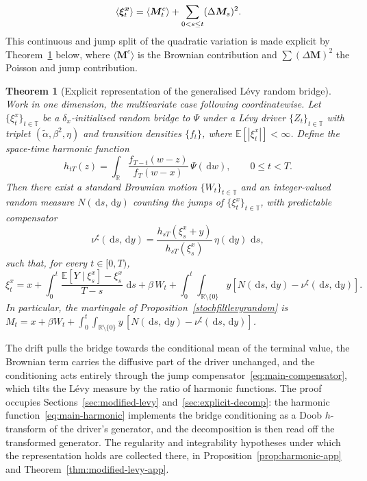 \documentclass{article}
\newtheorem{thm}{Theorem}[section]
\newcommand{\levy}{{L\'evy }}
\def\R{\mathbb{R}}
\def\E{\mathbb{E}}
\def\T{\mathbb{T}}
\def\d{\,\mathrm{d}}
\def\xib{\boldsymbol{\xi}}
\theoremstyle{definition}
\begin{document}
\begin{align}
\langle \xib^{\boldsymbol{x}}_t\rangle = \langle \boldsymbol{M}_t^c \rangle + \sum_{0 < s \leq t} (\Delta\boldsymbol{M}_s)^2. \notag
\end{align}
This continuous and jump split of the quadratic variation is made explicit by Theorem~\ref{thm:main-rep} below, where $\langle \boldsymbol{M}^c\rangle$ is the Brownian contribution and $\sum(\Delta\boldsymbol{M})^2$ the Poisson and jump contribution.

\begin{thm}[Explicit representation of the generalised \levy random bridge]
\label{thm:main-rep}
Work in one dimension, the multivariate case following coordinatewise. Let $\{\xi^{x}_t\}_{t \in \T}$ be a $\delta_x$-initialised random bridge to $\Psi$ under a \levy driver $\{Z_t\}_{t\in\T}$ with triplet $(\widetilde{\alpha}, \beta^2, \eta)$ and transition densities $\{f_t\}$, where $\E[|\xi^{x}_t|] < \infty$. Define the space-time harmonic function
\begin{equation}\label{eq:main-harmonic}
  h_{tT}(z) = \int_{\R} \frac{f_{T-t}(w - z)}{f_T(w - x)}\,\Psi(\d w), \qquad 0 \leq t < T.
\end{equation}
Then there exist a standard Brownian motion $\{W_t\}_{t\in\T}$ and an integer-valued random measure $N(\d s, \d y)$ counting the jumps of $\{\xi^{x}_t\}_{t\in\T}$, with predictable compensator
\begin{equation}\label{eq:main-compensator}
  \nu^{\xi}(\d s, \d y) = \frac{h_{sT}(\xi^{x}_s + y)}{h_{sT}(\xi^{x}_s)}\,\eta(\d y)\,\d s,
\end{equation}
such that, for every $t \in [0,T)$,
\begin{equation}\label{eq:main-rep}
  \xi^{x}_t = x + \int_0^t \frac{\E[Y \mid \xi^{x}_s] - \xi^{x}_s}{T-s}\,\d s
    + \beta\,W_t
    + \int_0^t\!\int_{\R \setminus \{0\}} y \left[N(\d s, \d y) - \nu^{\xi}(\d s, \d y)\right].
\end{equation}
In particular, the martingale of Proposition~\ref{stochfiltlevyrandom} is $M_t = x + \beta W_t + \int_0^t\!\int_{\R\setminus\{0\}} y\,[N(\d s,\d y) - \nu^{\xi}(\d s,\d y)]$.
\end{thm}
The drift pulls the bridge towards the conditional mean of the terminal value, the Brownian term carries the diffusive part of the driver unchanged, and the conditioning acts entirely through the jump compensator~\eqref{eq:main-compensator}, which tilts the \levy measure by the ratio of harmonic functions. The proof occupies Sections~\ref{sec:modified-levy} and~\ref{sec:explicit-decomp}: the harmonic function~\eqref{eq:main-harmonic} implements the bridge conditioning as a Doob $h$-transform of the driver's generator, and the decomposition is then read off the transformed generator. The regularity and integrability hypotheses under which the representation holds are collected there, in Proposition~\ref{prop:harmonic-app} and Theorem~\ref{thm:modified-levy-app}.
\end{document}
